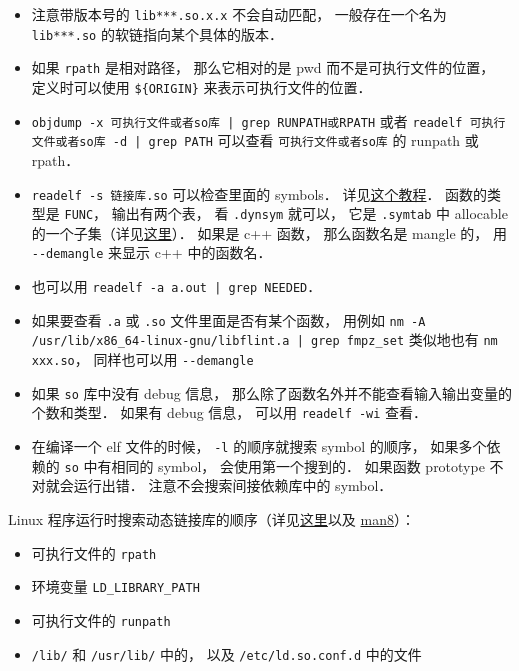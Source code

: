 \begin{itemize}
\item 注意带版本号的 \verb|lib***.so.x.x| 不会自动匹配， 一般存在一个名为 \verb|lib***.so| 的软链指向某个具体的版本．
\item 如果 \verb|rpath| 是相对路径， 那么它相对的是 pwd 而不是可执行文件的位置， 定义时可以使用 \verb|${ORIGIN}| 来表示可执行文件的位置．
\item \verb`objdump -x 可执行文件或者so库 | grep RUNPATH或RPATH` 或者 \verb`readelf 可执行文件或者so库 -d | grep PATH` 可以查看 \verb|可执行文件或者so库| 的 runpath 或 rpath．
\item \verb|readelf -s 链接库.so| 可以检查里面的 symbols． 详见\href{https://amir.rachum.com/blog/2016/09/17/shared-libraries/}{这个教程}． 函数的类型是 \verb|FUNC|， 输出有两个表， 看 \verb|.dynsym| 就可以， 它是 \verb|.symtab| 中 allocable 的一个子集（详见\href{https://blogs.oracle.com/solaris/post/inside-elf-symbol-tables}{这里}）． 如果是 c++ 函数， 那么函数名是 mangle 的， 用 \verb|--demangle| 来显示 c++ 中的函数名．
\item 也可以用 \verb`readelf -a a.out | grep NEEDED`．
\item 如果要查看 \verb|.a| 或 \verb|.so| 文件里面是否有某个函数， 用例如 \verb`nm -A /usr/lib/x86_64-linux-gnu/libflint.a | grep fmpz_set` 类似地也有 \verb|nm xxx.so|， 同样也可以用 \verb|--demangle|
\item 如果 \verb|so| 库中没有 debug 信息， 那么除了函数名外并不能查看输入输出变量的个数和类型． 如果有 debug 信息， 可以用 \verb|readelf -wi| 查看．
\item 在编译一个 elf 文件的时候， \verb|-l| 的顺序就搜索 symbol 的顺序， 如果多个依赖的 \verb|so| 中有相同的 symbol， 会使用第一个搜到的． 如果函数 prototype 不对就会运行出错． 注意不会搜索间接依赖库中的 symbol．
\end{itemize}

Linux 程序运行时搜索动态链接库的顺序（详见\href{https://unix.stackexchange.com/questions/22926/where-do-executables-look-for-shared-objects-at-runtime}{这里}以及 \href{https://man7.org/linux/man-pages/man8/ld.so.8.html}{man8}）：
\begin{itemize}
\item 可执行文件的 \verb|rpath|
\item 环境变量 \verb|LD_LIBRARY_PATH|
\item 可执行文件的 \verb|runpath|
\item \verb|/lib/| 和 \verb|/usr/lib/| 中的， 以及 \verb|/etc/ld.so.conf.d| 中的文件
\end{itemize}

